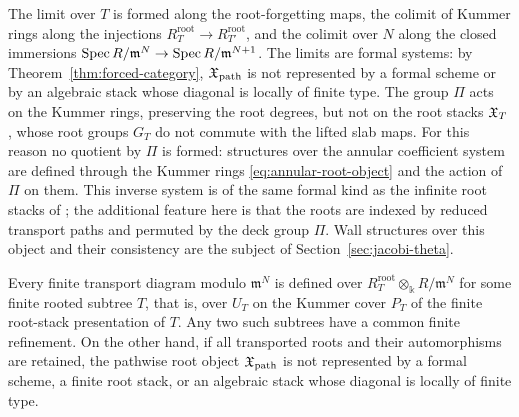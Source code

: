 The limit over $T$ is formed along the root-forgetting maps, the colimit of
Kummer rings along the injections $R_T^{\mathrm{root}}\to R_{T'}^{\mathrm{root}}$,
and the colimit over $N$ along the closed immersions
$\operatorname{Spec} R/\mathfrak m^N\to\operatorname{Spec} R/\mathfrak m^{N+1}$.  The limits are formal systems: by
Theorem~\ref{thm:forced-category}, $\mathfrak X_{\mathrm{path}}$ is not
represented by a formal scheme or by an algebraic stack whose diagonal is
locally of finite type.  The group $\Pi$ acts on the Kummer rings,
preserving the root degrees, but not on the root stacks $\mathfrak X_T$, whose
root groups $G_T$ do not commute with the lifted slab maps.  For this reason
no quotient by $\Pi$ is formed: structures over the annular coefficient
system are defined through the Kummer rings \eqref{eq:annular-root-object}
and the action of $\Pi$ on them.  This inverse system is of the same
formal kind as the infinite root stacks of
\cite[Def.~3.3 and Prop.~3.5]{talpovistoli2018}; the
additional feature here is that the roots are indexed by reduced transport
paths and permuted by the deck group $\Pi$.  Wall structures over this
object and their consistency are the subject of
Section~\ref{sec:jacobi-theta}.

\begin{theorem}
\label{thm:forced-category}
Every finite transport diagram modulo $\mathfrak m^N$ is defined over
$R_T^{\mathrm{root}}\otimes_\Bbbk R/\mathfrak m^N$ for some finite rooted subtree $T$,
that is, over $U_T$ on the Kummer cover $P_T$ of the finite root-stack
presentation of $T$.  Any two such subtrees have a common finite refinement.
On the other hand, if all transported roots and their automorphisms are
retained, the pathwise root object $\mathfrak X_{\mathrm{path}}$ is not
represented by a formal scheme, a finite root stack, or an algebraic stack
whose diagonal is locally of finite type.
\end{theorem}

